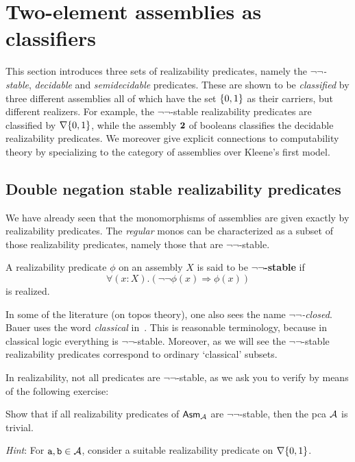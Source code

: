 \section{Two-element assemblies as classifiers}

This section introduces three sets of realizability predicates, namely the
\emph{\(\lnot\lnot\)-stable}, \emph{decidable} and \emph{semidecidable}
predicates.
%
These are shown to be \emph{classified} by three different assemblies all of
which have the set \(\set{0,1}\) as their carriers, but different realizers.
%
For example, the \(\lnot\lnot\)-stable realizability predicates are classified
by \(\nabla\set{0,1}\), while the assembly \(\Two\) of booleans classifies the
decidable realizability predicates.
%
We moreover give explicit connections to computability theory by specializing to
the category of assemblies over Kleene's first model.

\subsection{Double negation stable realizability predicates}\label{sec:double-negation-stable}

We have already seen that the monomorphisms of assemblies are given exactly by
realizability predicates. The \emph{regular} monos can be characterized as a
subset of those realizability predicates, namely those that are
\(\lnot\lnot\)-stable.

\begin{definition}
  A realizability predicate \(\phi\) on an assembly \(X\) is said to be
  \textbf{\(\lnot\lnot\)-stable} if
  \[
    \forall(x : X).(\lnot\lnot\phi(x) \Rightarrow \phi(x))
  \]
  is realized.
\end{definition}

In some of the literature (on topos theory), one also sees the name
\emph{\(\lnot\lnot\)-closed}.
%
Bauer uses the word \emph{classical} in~\cite{Bauer2023}.
%
This is reasonable terminology, because in classical logic everything is
\(\lnot\lnot\)-stable. Moreover, as we will see the \(\lnot\lnot\)-stable
realizability predicates correspond to ordinary `classical' subsets.

In realizability, not all predicates are \(\lnot\lnot\)-stable, as we ask you to
verify by means of the following exercise:

\begin{exercise}\label{exer:not-double-negation-stable-predicate}
  Show that if all realizability predicates of \(\Asm{\AA}\) are
  \(\lnot\lnot\)-stable, then the pca \(\AA\) is trivial.

  \emph{Hint}: For \(\pca{a},\pca{b} \in \AA\), consider a suitable
  realizability predicate on \(\nabla\set{0,1}\).
\end{exercise}

